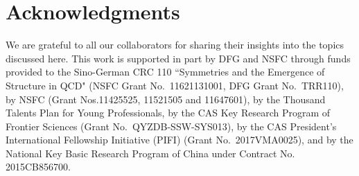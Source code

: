\documentclass[aps,rmp,showpacs,twocolumn,nofootinbib,superscriptaddress,
reprint,amsmath,amssymb]{revtex4-1}
\begin{document}



\section*{Acknowledgments}

We are grateful to all our collaborators for sharing their insights into the
topics discussed here.
This work is supported in part by DFG and NSFC through funds provided to the
Sino-German CRC 110 ``Symmetries and the Emergence of Structure in QCD" (NSFC
Grant No.~11621131001, DFG Grant No.~TRR110), by NSFC (Grant Nos.11425525,
11521505 and 11647601), by the Thousand Talents Plan for Young Professionals, by
the CAS Key Research Program of Frontier Sciences (Grant No.~QYZDB-SSW-SYS013),
by the CAS President's International Fellowship Initiative (PIFI) (Grant
No.~2017VMA0025), and by the National Key Basic Research Program of China under
Contract No. 2015CB856700.



\end{document}
